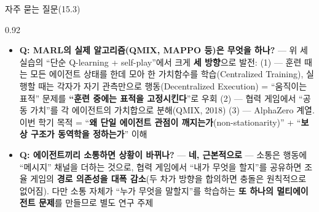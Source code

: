 \begin{frame}{자주 묻는 질문(15.3)}
\begin{center}\begin{varwidth}{0.92\textwidth}
  \small
  \begin{itemize}
    \item \textbf{Q: MARL의 실제 알고리즘(QMIX, MAPPO
      등)은 무엇을 하나?} --- 위 세 실습의 ``단순 Q-learning
      + self-play''에서 크게 \textbf{세 방향}으로 발전:
      (1)  --- 훈련 때는 모든
      에이전트 상태를 한데 모아 한 가치함수를
      학습(Centralized Training), 실행할 때는 각자가 자기
      관측만으로 행동(Decentralized Execution) =
      ``움직이는 표적'' 문제를 \textbf{``훈련 중에는 표적을
      고정시킨다}''로 우회 (2)  ---
      협력 게임에서 ``공동 가치''를 각 에이전트의 가치합으로
      분해(QMIX, 2018) (3)  ---
      AlphaZero 계열. 이번 학기 목적 = ``\textbf{왜 단일
      에이전트 관점이 깨지는가}(non-stationarity)'' +
      ``\textbf{보상 구조가 동역학을 정하는가}'' 이해
    \item \textbf{Q: 에이전트끼리 소통하면 상황이 바뀌나?}
      --- \textbf{네, 근본적으로} --- 소통은 행동에 ``메시지''
      채널을 더하는 것으로, 협력 게임에서 ``내가 무엇을
      할지''를 공유하면 조율 게임의 \textbf{경로 의존성을
      대폭 감소}(두 차가 방향을 합의하면 충돌은 원칙적으로
      없어짐). 다만 소통 자체가 ``누가 무엇을 말할지''를
      학습하는 \textbf{또 하나의 멀티에이전트 문제}를
      만들므로 별도 연구 주제
  \end{itemize}
\end{varwidth}\end{center}
\end{frame}
